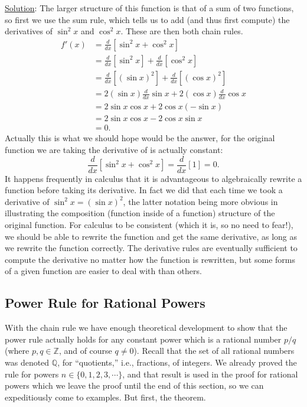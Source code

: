 \underline{Solution}: The larger structure of this function is that
of a sum of two functions, so first we use the sum rule,
which tells us to add (and thus first compute) the derivatives
of $\sin^2x$ and $\cos^2x$.  These are then both chain rules.
\begin{align*}
f'(x)&=\frac{d}{dx}\left[\sin^2x+\cos^2x\right]\\
    &=\frac{d}{dx}\left[\sin^2x\right]+\frac{d}{dx}\left[\cos^2x\right]\\
    &=\frac{d}{dx}\left[(\sin x)^2\right]+\frac{d}{dx}\left[(\cos x)^2\right]\\
    &=2(\sin x)\frac{d}{dx}\sin x+2(\cos x)\frac{d}{dx}\cos x\\
    &=2\sin x\cos x+2\cos x(-\sin x)\\
    &=2\sin x\cos x-2\cos x\sin x\\
    &=0.\end{align*}
Actually this is what we should hope would be the answer, for the original
function we are taking the derivative of is actually constant:
$$\frac{d}{dx}\left[\sin^2x+\cos^2x\right]=\frac{d}{dx}[1]=0.$$
\eex
It happens frequently in calculus that it is advantageous to algebraically
rewrite a function before taking its derivative.  In fact we did that
each time we took a derivative of $\sin^2x=(\sin x)^2$, the latter
notation being more obvious in illustrating the composition
(function inside of a function) structure of the original function.
For calculus to be consistent (which it is, so no need to fear!),
we should be able to rewrite the function and get the same derivative,
as long as we rewrite the function correctly.  The derivative rules
are eventually sufficient to compute the derivative no matter how
the function is rewritten, but some forms of a given function
are easier to deal with than others.

\subsection{Power Rule for Rational Powers}

With the chain rule we have enough theoretical development to 
show that the power rule actually holds for any constant
power which is a rational number $p/q$ (where $p,q\in\mathbb{Z}$,
and of course $q\ne0$). 
Recall that the set of all rational
numbers was denoted $\mathbb{Q}$, for ``quotients,'' i.e., 
fractions, of integers.  We already proved the rule for powers
$n\in\{0,1,2,3,\cdots\}$, and that result is used in the 
proof for rational powers which we leave the proof until the end
of this section, so we can expeditiously come to examples.
But first, the theorem.

